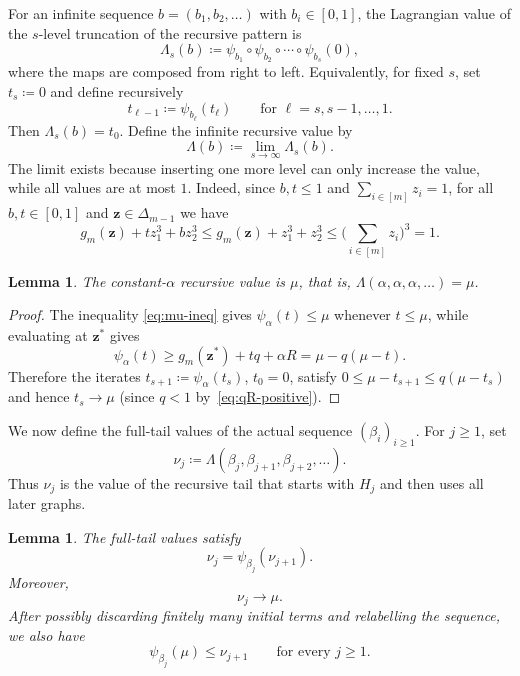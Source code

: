 \documentclass[10pt]{article}
\numberwithin{equation}{section}
\newtheorem{lemma}[theorem]{Lemma}
\begin{document}
For an infinite sequence $b=(b_1,b_2,\ldots)$ with $b_i\in[0,1]$, the Lagrangian value of the $s$-level truncation of the recursive pattern is
\[
        \Lambda_s(b)\coloneqq \psi_{b_1}\circ\psi_{b_2}\circ\cdots\circ\psi_{b_s}(0),
\]
where the maps are composed from right to left.  Equivalently, for fixed $s$, set $t_s\coloneqq 0$ and define recursively
\[
        t_{\ell-1}\coloneqq \psi_{b_\ell}(t_\ell) \qquad \text{for } \ell=s,s-1,\ldots,1.
\]
Then $\Lambda_s(b)=t_0$. 
Define the infinite recursive value by
\begin{equation}
        \Lambda(b)\coloneqq \lim_{s\to\infty}\Lambda_s(b).
        \label{eq:Lambda-def}
\end{equation}
The limit exists because inserting one more level can only increase the value, while all values are at most $1$. Indeed, since $b,t\le 1$ and $\sum_{i\in[m]} z_i=1$, for all $b,t\in[0,1]$ and $\mathbf{z}\in\Delta_{m-1}$ we have 
\[
        g_m(\mathbf{z})+tz_1^3+bz_2^3
        \le g_m(\mathbf{z})+z_1^3+z_2^3
        \le \Big(\sum_{i\in [m]} z_i\Big)^3=1.
\]

\begin{lemma}\label{lem:alpha-tail-value}
The constant-$\alpha$ recursive value is $\mu$, that is, $\Lambda(\alpha,\alpha,\alpha,\ldots)=\mu$. 
\end{lemma}

\begin{proof}
The inequality \eqref{eq:mu-ineq} gives $\psi_\alpha(t)\le \mu$ whenever $t\le \mu$, while evaluating at $\mathbf{z}^*$ gives
\begin{equation}
        \psi_\alpha(t) \ge g_m(\mathbf{z}^*)+tq+\alpha R =\mu-q(\mu-t).
        \label{eq:alpha-contraction}
\end{equation}
Therefore the iterates $t_{s+1}\coloneqq \psi_\alpha(t_s)$, $t_0=0$, satisfy $0\le \mu-t_{s+1}\le q(\mu-t_s)$ and hence $t_s\to \mu$ (since $q<1$ by~\eqref{eq:qR-positive}).
\end{proof}

We now define the full-tail values of the actual sequence $(\beta_i)_{i \ge 1}$. For $j\ge 1$, set
\begin{equation}
        \nu_j\coloneqq \Lambda(\beta_j,\beta_{j+1},\beta_{j+2},\ldots).
        \label{eq:nuj-def}
\end{equation}
Thus $\nu_j$ is the value of the recursive tail that starts with $H_j$ and then uses all later graphs.

\begin{lemma}\label{lem:nuj-properties}
The full-tail values satisfy
\begin{equation}
        \nu_j=\psi_{\beta_j}(\nu_{j+1}).
        \label{eq:nuj-recursion}
\end{equation}
Moreover,
\begin{equation}
        \nu_j\to \mu.
        \label{eq:nuj-to-mu}
\end{equation}
After possibly discarding finitely many initial terms and relabelling the sequence, we also have
\begin{equation}
        \psi_{\beta_j}(\mu)\le \nu_{j+1} \qquad\text{for every }j\ge 1.
        \label{eq:overlap-basic}
\end{equation}
\end{lemma}
\end{document}
